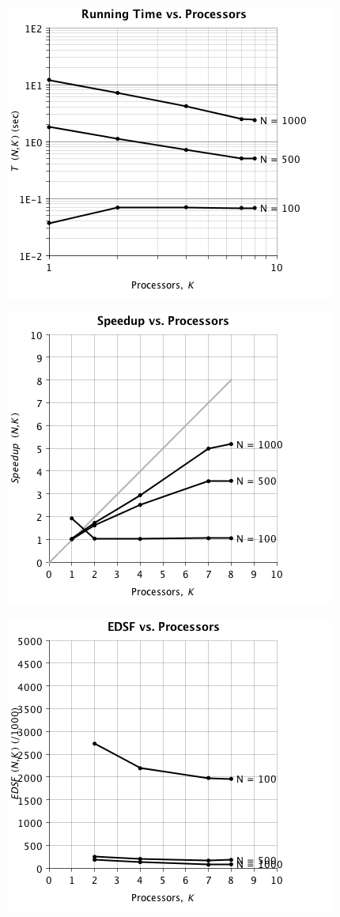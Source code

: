 \documentclass{dependencies/acm_proc_article-sp}
\begin{document}
\begin{center}
\includegraphics[scale=0.5]{images/parallel-stras/running-vs-proc.png}
\end{center}
\begin{center}
\includegraphics[scale=0.5]{images/parallel-stras/speedup-vs-proc.png}
\end{center}
\begin{center}
\includegraphics[scale=0.5]{images/parallel-stras/edsf-vs-proc.png}
\end{center}
\end{document}
